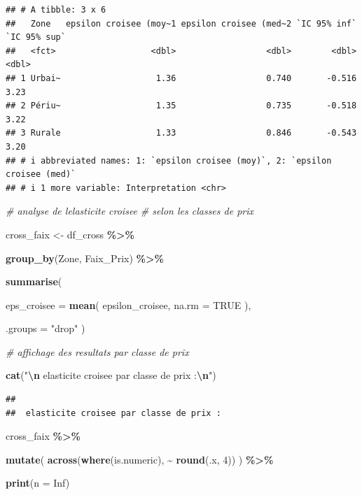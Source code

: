 \documentclass[
]{article}
\newenvironment{Shaded}{\begin{snugshade}}{\end{snugshade}}
\newcommand{\AttributeTok}[1]{\textcolor[rgb]{0.13,0.29,0.53}{#1}}
\newcommand{\CommentTok}[1]{\textcolor[rgb]{0.56,0.35,0.01}{\textit{#1}}}
\newcommand{\ConstantTok}[1]{\textcolor[rgb]{0.56,0.35,0.01}{#1}}
\newcommand{\DecValTok}[1]{\textcolor[rgb]{0.00,0.00,0.81}{#1}}
\newcommand{\FunctionTok}[1]{\textcolor[rgb]{0.13,0.29,0.53}{\textbf{#1}}}
\newcommand{\NormalTok}[1]{#1}
\newcommand{\OtherTok}[1]{\textcolor[rgb]{0.56,0.35,0.01}{#1}}
\newcommand{\SpecialCharTok}[1]{\textcolor[rgb]{0.81,0.36,0.00}{\textbf{#1}}}
\newcommand{\StringTok}[1]{\textcolor[rgb]{0.31,0.60,0.02}{#1}}
\begin{document}
\begin{verbatim}
## # A tibble: 3 x 6
##   Zone   epsilon croisee (moy~1 epsilon croisee (med~2 `IC 95% inf` `IC 95% sup`
##   <fct>                   <dbl>                  <dbl>        <dbl>        <dbl>
## 1 Urbai~                   1.36                  0.740       -0.516         3.23
## 2 Périu~                   1.35                  0.735       -0.518         3.22
## 3 Rurale                   1.33                  0.846       -0.543         3.20
## # i abbreviated names: 1: `epsilon croisee (moy)`, 2: `epsilon croisee (med)`
## # i 1 more variable: Interpretation <chr>
\end{verbatim}

\begin{Shaded}
\begin{Highlighting}[]
\CommentTok{\# analyse de l\textquotesingle{}elasticite croisee}
\CommentTok{\# selon les classes de prix}

\NormalTok{cross\_faix }\OtherTok{\textless{}{-}}\NormalTok{ df\_cross }\SpecialCharTok{\%\textgreater{}\%}

  \FunctionTok{group\_by}\NormalTok{(Zone, Faix\_Prix) }\SpecialCharTok{\%\textgreater{}\%}

  \FunctionTok{summarise}\NormalTok{(}

    \AttributeTok{eps\_croisee =} \FunctionTok{mean}\NormalTok{(}
\NormalTok{      epsilon\_croisee,}
      \AttributeTok{na.rm =} \ConstantTok{TRUE}
\NormalTok{    ),}

    \AttributeTok{.groups =} \StringTok{"drop"}
\NormalTok{  )}


\CommentTok{\# affichage des resultats par classe de prix}

\FunctionTok{cat}\NormalTok{(}\StringTok{"}\SpecialCharTok{\textbackslash{}n}\StringTok{ elasticite croisee par classe de prix :}\SpecialCharTok{\textbackslash{}n}\StringTok{"}\NormalTok{)}
\end{Highlighting}
\end{Shaded}

\begin{verbatim}
## 
##  elasticite croisee par classe de prix :
\end{verbatim}

\begin{Shaded}
\begin{Highlighting}[]
\NormalTok{cross\_faix }\SpecialCharTok{\%\textgreater{}\%}

  \FunctionTok{mutate}\NormalTok{(}
    \FunctionTok{across}\NormalTok{(}\FunctionTok{where}\NormalTok{(is.numeric), }\SpecialCharTok{\textasciitilde{}} \FunctionTok{round}\NormalTok{(.x, }\DecValTok{4}\NormalTok{))}
\NormalTok{  ) }\SpecialCharTok{\%\textgreater{}\%}

  \FunctionTok{print}\NormalTok{(}\AttributeTok{n =} \ConstantTok{Inf}\NormalTok{)}
\end{Highlighting}
\end{Shaded}
\end{document}
